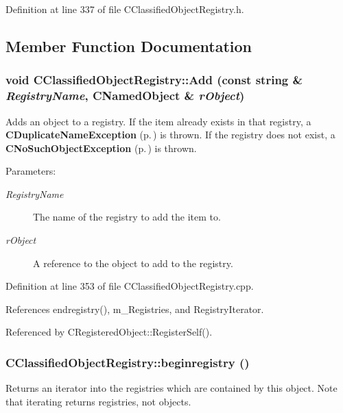 Definition at line 337 of file CClassified\-Object\-Registry.h.

\subsection{Member Function Documentation}
\subsubsection{\setlength{\rightskip}{0pt plus 5cm}void CClassified\-Object\-Registry::Add (const string \& {\em Registry\-Name}, {\bf CNamed\-Object} \& {\em r\-Object})}\label{classCClassifiedObjectRegistry_a5}


Adds an object to a registry. If the item already exists in that registry, a  {\bf CDuplicate\-Name\-Exception} {\rm (p.\,\pageref{classCDuplicateNameException})} is thrown. If the registry does not exist, a {\bf CNo\-Such\-Object\-Exception} {\rm (p.\,\pageref{classCNoSuchObjectException})} is thrown.\begin{Desc}
\item[Parameters: ]\par
\begin{description}
\item[{\em 
Registry\-Name}]The name of the registry to add the item to. \item[{\em 
r\-Object}]A reference to the object to add to the registry. \end{description}
\end{Desc}


Definition at line 353 of file CClassified\-Object\-Registry.cpp.

References endregistry(), m\_\-Registries, and Registry\-Iterator.

Referenced by CRegistered\-Object::Register\-Self().
\subsubsection{ CClassified\-Object\-Registry::beginregistry ()}\label{classCClassifiedObjectRegistry_a9}


Returns an iterator into the registries which are contained by this object. Note that iterating returns registries, not objects. 

